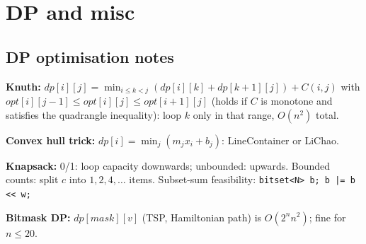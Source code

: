 \chapter{DP and misc}


\section{DP optimisation notes}
	\textbf{Knuth:} $dp[i][j] = \min_{i \le k < j}(dp[i][k] + dp[k+1][j]) + C(i,j)$ with
	$opt[i][j-1] \le opt[i][j] \le opt[i+1][j]$ (holds if $C$ is monotone and satisfies the
	quadrangle inequality): loop $k$ only in that range, $O(n^2)$ total.

	\textbf{Convex hull trick:} $dp[i] = \min_j (m_j x_i + b_j)$: LineContainer or LiChao.

	\textbf{Knapsack:} 0/1: loop capacity downwards; unbounded: upwards. Bounded
	counts: split $c$ into $1,2,4,\dots$ items. Subset-sum feasibility: \texttt{bitset<N> b; b |= b << w;}

	\textbf{Bitmask DP:} $dp[mask][v]$ (TSP, Hamiltonian path) is $O(2^n n^2)$; fine for $n \le 20$.

